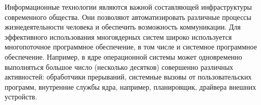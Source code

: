 
{\actuality} Информационные технологии являются важной составляющей инфраструктуры современного общества.
Они позволяют автоматизировать различные процессы жизнедеятельности человека и обеспечить возможность коммуникации.
Для эффективного использования многоядерных систем широко используется многопоточное программное обеспечение, в том числе и системное программное обеспечение.
Например, в ядре операционной системы может одновременно выполняться большое число (несколько десятков) совершенно различных активностей: обработчики прерываний, системные вызовы от пользовательских программ, внутренние службы ядра, например, планировщик, драйвера внешних устройств.
%


